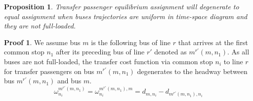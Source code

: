 \documentclass[fleqn]{article}
\newcounter{proposition}
\newcounter{proof}
\newtheorem{mypro}[proposition]{Proposition}
\theoremstyle{definition} \newtheorem*{myproof}{Proof}
\begin{document}
\begin{mypro}\label{thm:light}
    Transfer passenger equilibrium assignment will degenerate to equal assignment 
    when buses trajectories are uniform in time-space diagram and they are not full-loaded. 
\end{mypro}
\begin{myproof}
    We assume bus $m$ is the following bus of line $r$ that arrives at the first common stop $n_{1}$ 
    after its preceding bus of line $r'$ denoted as $m^{r'}(m,n_{1})$.
    As all buses are not full-loaded, the transfer cost function via common stop $n_{i}$ to line $r$ for transfer passengers on bus $m^{r'}\left(m,n_{1}\right)$ 
    degenerates to the headway between bus $m^{r'}\left(m,n_{1}\right)$ and bus $m$.
    \begin{equation}
        \omega_{n_i}^{m^{r'}\left(m,n_{1}\right)} = \omega_{n_i}^{m^{r'}\left(m,n_{1}\right),m} 
        = d_{m,n_{i}}-d_{m^{r'}\left(m,n_{1}\right),n_{i}}
      \end{equation}


\end{myproof}
\end{document}
